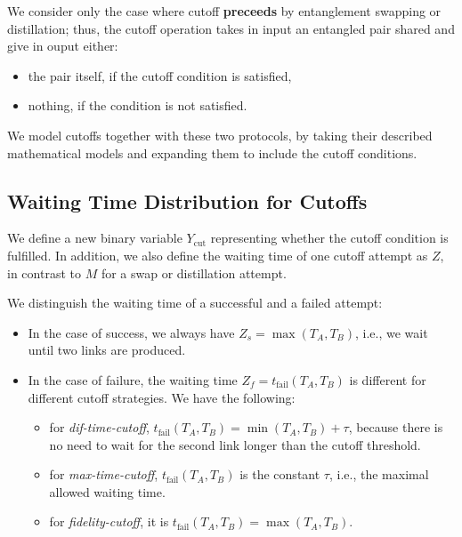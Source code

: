 \documentclass{masterthesis}
\begin{document}

We consider only the case where cutoff \textbf{preceeds} by entanglement swapping or distillation; thus, the cutoff operation takes in input an entangled pair shared and give in ouput either:
\begin{itemize}
    \item the pair itself, if the cutoff condition is satisfied,
    \item nothing, if the condition is not satisfied.
\end{itemize} 

We model cutoffs together with these two protocols, by taking their described mathematical models and expanding them to include the cutoff conditions.


\subsection*{Waiting Time Distribution for Cutoffs}

We define a new binary variable $Y_{\text{cut}}$ representing whether the cutoff condition is fulfilled. 
In addition, we also define the waiting time of one cutoff attempt as $Z$, in contrast to $M$ for a swap or distillation attempt. 

We distinguish the waiting time of a successful and a failed attempt: 
\begin{itemize}
    \item In the case of success, we always have $Z_s = \max(T_A, T_B)$, i.e., we wait until two links are produced.
    \item In the case of failure, the waiting time $Z_f = t_{\text{fail}}(T_A, T_B)$ is different for different cutoff strategies. We have the following:
    \begin{itemize}
        \item for \textit{dif-time-cutoff}, $t_{\text{fail}}(T_A, T_B) = \min(T_A, T_B) + \tau$, because there is no need to wait for the second link longer than the cutoff threshold. 
        \item for \textit{max-time-cutoff}, $t_{\text{fail}}(T_A, T_B)$ is the constant $\tau$, i.e., the maximal allowed waiting time. 
        \item for \textit{fidelity-cutoff}, it is $t_{\text{fail}}(T_A, T_B) = \max(T_A, T_B)$.
    \end{itemize}
\end{itemize}
\end{document}
